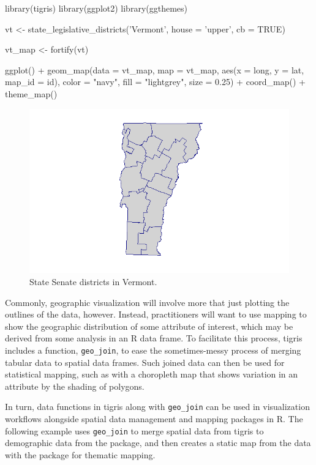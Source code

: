 \begin{Schunk}
\begin{Sinput}
library(tigris)
library(ggplot2)
library(ggthemes)

vt <- state_legislative_districts('Vermont', house = 'upper', cb = TRUE)

vt_map <- fortify(vt)

ggplot() + 
  geom_map(data = vt_map, map = vt_map, 
           aes(x = long, y = lat, map_id = id), 
           color = "navy", fill = "lightgrey", 
           size = 0.25) + 
  coord_map() + 
  theme_map()
\end{Sinput}
\end{Schunk}

\begin{figure}[htbp]
  \centering
  \includegraphics[width=\textwidth]{vt_districts}
  \caption{State Senate districts in Vermont.}
  \label{figure:vt_districts}
\end{figure}

Commonly, geographic visualization will involve more that just plotting
the outlines of the data, however. Instead, practitioners will want to
use mapping to show the geographic distribution of some attribute of
interest, which may be derived from some analysis in an R data frame. To
facilitate this process, tigris includes a function, \texttt{geo\_join},
to ease the sometimes-messy process of merging tabular data to spatial
data frames. Such joined data can then be used for statistical mapping,
such as with a choropleth map that shows variation in an attribute by
the shading of polygons.

In turn, data functions in tigris along with \texttt{geo\_join} can be
used in visualization workflows alongside spatial data management and
mapping packages in R. The following example uses \texttt{geo\_join} to
merge spatial data from tigris to demographic data from the
 package, and then creates a static map from the data with
the  package for thematic mapping.


